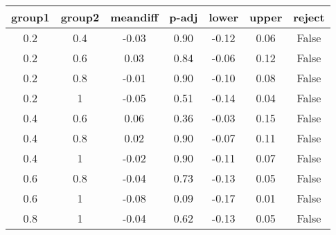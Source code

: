 \begin{tabular}{|c|c|c|c|c|c|c|}
\toprule
group1 & group2 &  meandiff &  p-adj &  lower &  upper &  reject \\
\midrule
   0.2 &    0.4 &     -0.03 &   0.90 &  -0.12 &   0.06 &   False \\
   0.2 &    0.6 &      0.03 &   0.84 &  -0.06 &   0.12 &   False \\
   0.2 &    0.8 &     -0.01 &   0.90 &  -0.10 &   0.08 &   False \\
   0.2 &      1 &     -0.05 &   0.51 &  -0.14 &   0.04 &   False \\
   0.4 &    0.6 &      0.06 &   0.36 &  -0.03 &   0.15 &   False \\
   0.4 &    0.8 &      0.02 &   0.90 &  -0.07 &   0.11 &   False \\
   0.4 &      1 &     -0.02 &   0.90 &  -0.11 &   0.07 &   False \\
   0.6 &    0.8 &     -0.04 &   0.73 &  -0.13 &   0.05 &   False \\
   0.6 &      1 &     -0.08 &   0.09 &  -0.17 &   0.01 &   False \\
   0.8 &      1 &     -0.04 &   0.62 &  -0.13 &   0.05 &   False \\
\bottomrule
\end{tabular}
